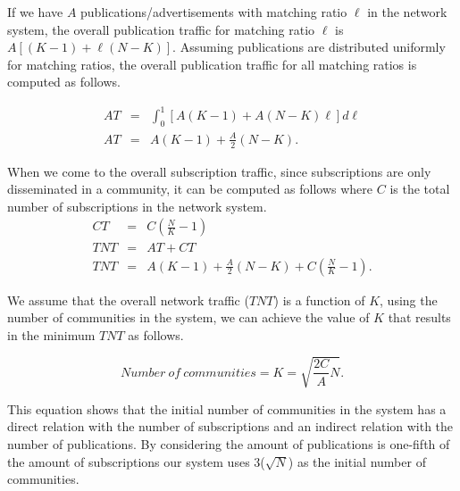 If we have $A$ publications/advertisements with matching ratio $\ell$ in the network system, the overall publication traffic for matching ratio $\ell$ is $A[(K-1)+\ell(N-K)]$. Assuming publications are distributed uniformly for matching ratios, the overall publication traffic for all matching ratios is computed as follows.

\begin{eqnarray}
AT&=&\int_0^1[A(K-1)+A(N-K)\ell]d\ell \nonumber\\
AT&=&A(K-1)+\frac{A}{2}(N-K).
\end{eqnarray}

When we come to the overall subscription traffic, since subscriptions are only disseminated in a community, it can be computed as follows where $C$ is the total number of subscriptions in the network system.
\begin{eqnarray}
CT&=&C\left(\frac{N}{K}-1\right)\\
TNT&=&AT+CT \nonumber\\
TNT&=&A(K-1)+\frac{A}{2}(N-K)+C\left(\frac{N}{K}-1\right).
\end{eqnarray}

We assume that the overall network traffic ($TNT$) is a function of $K$, using the number of communities in the system, we can achieve the value of $K$ that results in the minimum $TNT$ as follows.

\begin{equation}
Number~of~communities=K=\sqrt{\frac{2C}{A}N}.
\end{equation}

This equation shows that the initial number of communities in the system has a direct relation with the number of subscriptions and an indirect relation with the number of publications. By considering the amount of publications is one-fifth of the amount of subscriptions our system uses 3($\sqrt{N}$) as the initial number of communities.

